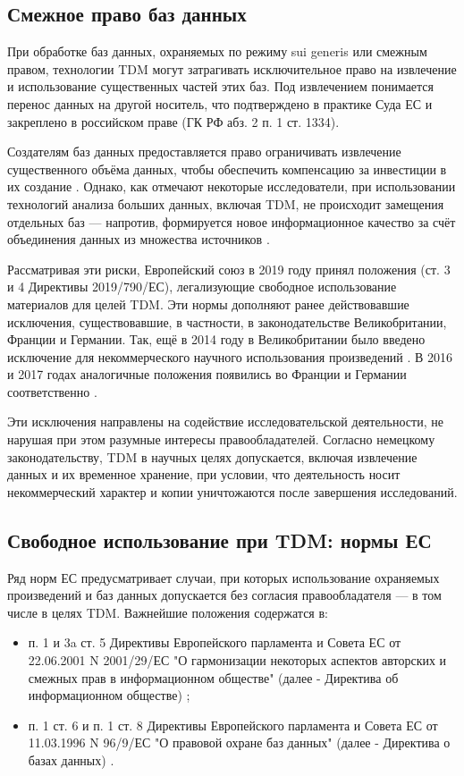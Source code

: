 \subsection*{Смежное право баз данных}

При обработке баз данных, охраняемых по режиму sui generis или смежным правом,
технологии TDM могут затрагивать исключительное право на извлечение и
использование существенных частей этих баз. Под извлечением понимается перенос
данных на другой носитель, что подтверждено в практике Суда ЕС
\cite{britishhorseracing2004} и закреплено в российском праве (ГК РФ абз. 2 п.
1 ст. 1334).

Создателям баз данных предоставляется право ограничивать извлечение
существенного объёма данных, чтобы обеспечить компенсацию за инвестиции в их
создание \cite{directive96}. Однако, как отмечают некоторые исследователи, при
использовании технологий анализа больших данных, включая TDM, не происходит
замещения отдельных баз — напротив, формируется новое информационное качество
за счёт объединения данных из множества источников \cite{zieger2020}.

Рассматривая эти риски, Европейский союз в 2019 году принял положения (ст. 3 и
4 Директивы 2019/790/ЕС), легализующие свободное использование материалов для
целей TDM. Эти нормы дополняют ранее действовавшие исключения, существовавшие,
в частности, в законодательстве Великобритании, Франции и Германии. Так, ещё в
2014 году в Великобритании было введено исключение для некоммерческого научного
использования произведений \cite{ukcopyright1988}. В 2016 и 2017 годах
аналогичные положения появились во Франции и Германии соответственно
\cite{frcode, gerurhg}.

Эти исключения направлены на содействие исследовательской деятельности, не
нарушая при этом разумные интересы правообладателей. Согласно немецкому
законодательству, TDM в научных целях допускается, включая извлечение данных и
их временное хранение, при условии, что деятельность носит некоммерческий
характер и копии уничтожаются после завершения исследований.

\subsection*{Свободное использование при TDM: нормы ЕС}

Ряд норм ЕС предусматривает случаи, при которых использование охраняемых
произведений и баз данных допускается без согласия правообладателя — в том
числе в целях TDM. Важнейшие положения содержатся в:
\begin{itemize}
    \item п. 1 и 3a ст. 5 Директивы Европейского парламента и Совета ЕС от
    22.06.2001 N 2001/29/ЕС "О гармонизации некоторых аспектов авторских и
    смежных прав в информационном обществе" (далее - Директива об
    информационном обществе) \cite{directive2001};
    \item п. 1 ст. 6 и п. 1 ст. 8 Директивы Европейского парламента и Совета ЕС
    от 11.03.1996 N 96/9/ЕС "О правовой охране баз данных" (далее -
    Директива о базах данных) \cite{directive1996}.
\end{itemize}

